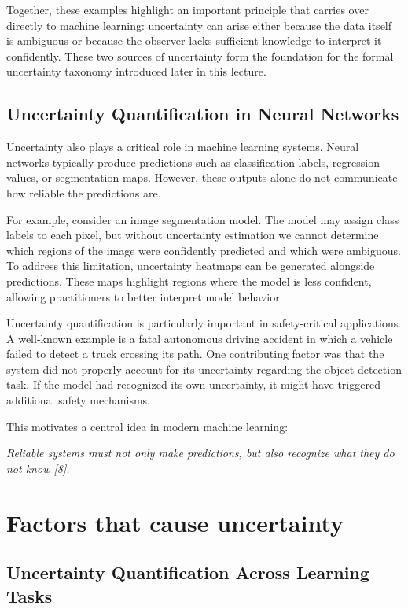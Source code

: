 \documentclass{article}
\renewcommand{\cite}[1]{[#1]}
\begin{document}
Together, these examples highlight an important principle that carries over directly to machine learning: uncertainty can arise either because the data itself is ambiguous or because the observer lacks sufficient knowledge to interpret it confidently. These two sources of uncertainty form the foundation for the formal uncertainty taxonomy introduced later in this lecture.

\subsection{Uncertainty Quantification in Neural Networks}

Uncertainty also plays a critical role in machine learning systems. Neural networks typically produce predictions such as classification labels, regression values, or segmentation maps. However, these outputs alone do not communicate how reliable the predictions are.

For example, consider an image segmentation model. The model may assign class labels to each pixel, but without uncertainty estimation we cannot determine which regions of the image were confidently predicted and which were ambiguous. To address this limitation, uncertainty heatmaps can be generated alongside predictions. These maps highlight regions where the model is less confident, allowing practitioners to better interpret model behavior.

Uncertainty quantification is particularly important in safety-critical applications. A well-known example is a fatal autonomous driving accident in which a vehicle failed to detect a truck crossing its path. One contributing factor was that the system did not properly account for its uncertainty regarding the object detection task. If the model had recognized its own uncertainty, it might have triggered additional safety mechanisms.

This motivates a central idea in modern machine learning:

\begin{center}
\textit{Reliable systems must not only make predictions, but also recognize what they do not know \cite{8}.}
\end{center}

\section{Factors that cause uncertainty}
\label{sec:27.3}

\subsection{Uncertainty Quantification Across Learning Tasks}
\end{document}
